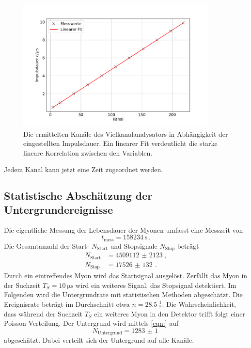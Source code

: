 \begin{figure}
    \centering
    \includegraphics[width=0.9\textwidth]{content/plots/calibration.pdf}
    \caption{Die ermittelten Kanäle des Vielkanalanalysators in Abhängigkeit der eingestellten Impulsdauer.
    Ein linearer Fit verdeutlicht die starke lineare Korrelation zwischen den Variablen.
    }
    \label{fig:kalibration}
\end{figure}
Jedem Kanal kann jetzt eine Zeit zugeordnet werden.
\FloatBarrier

\subsection{Statistische Abschätzung der Untergrundereignisse}
Die eigentliche Messung der Lebensdauer der Myonen umfasst eine Messzeit von
\begin{equation*}
    t_\text{mess} = \qty{158234}{\second} \,.
\end{equation*}
Die Gesamtanzahl der Start- $N_\text{Start}$ und Stopsignale $N_\text{Stop}$ beträgt
\begin{align*}
    N_\text{Start} &= \qty{4509112(2123)}{}, \\
    N_\text{Stop} &= \qty{17526(132)}{} \,.
\end{align*}
Durch ein eintreffendes Myon wird das Startsignal ausgelöst.
Zerfällt das Myon in der Suchzeit $T_S = \qty{10}{\micro\second}$ wird ein weiteres Signal, das Stopsignal detektiert.
Im Folgenden wird die Untergrundrate mit statistischen Methoden abgeschätzt.
Die Ereignisrate beträgt im Durchschnitt etwa $n = \qty{28.5}{\frac{1}{\second}}$.
Die Wahrscheinlichkeit, dass während der Suchzeit $T_S$ ein weiteres Myon in den Detektor trifft folgt einer Poisson-Verteilung.  
Der Untergrund wird mittels \autoref{eqn:} auf %
\begin{equation}
    N_\text{Untergrund} = \qty{1283(1)}{}
\end{equation}
abgeschätzt.
Dabei verteilt sich der Untergrund auf alle Kanäle.

